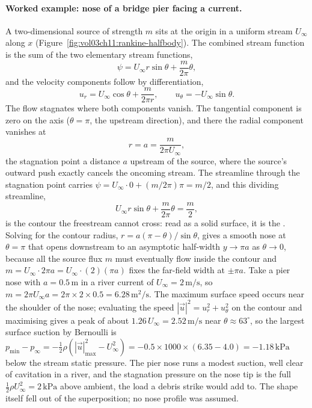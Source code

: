 

\paragraph{Worked example: nose of a bridge pier facing a current.} A
two-dimensional source of strength $m$ sits at the origin in a uniform
stream $U_\infty$ along $x$ (Figure~\ref{fig:vol03ch11:rankine-halfbody}).
The combined stream function is the sum of the two elementary stream
functions,
\[
\psi = U_\infty r\sin\theta + \frac{m}{2\pi}\theta,
\]
and the velocity components follow by differentiation,
\[
u_r = U_\infty\cos\theta + \frac{m}{2\pi r}, \qquad
u_\theta = -U_\infty\sin\theta.
\]
The flow stagnates where both components vanish. The tangential
component is zero on the axis ($\theta = \pi$, the upstream
direction), and there the radial component vanishes at
\[
r = a = \frac{m}{2\pi U_\infty},
\]
the stagnation point a distance $a$ upstream of the source, where the
source's outward push exactly cancels the oncoming stream. The
streamline through the stagnation point carries $\psi =
U_\infty\cdot 0 + (m/2\pi)\pi = m/2$, and this dividing streamline,
\[
U_\infty r\sin\theta + \frac{m}{2\pi}\theta = \frac{m}{2},
\]
is the contour the freestream cannot cross: read as a solid surface,
it is the . Solving for the contour radius,
$r = a(\pi - \theta)/\sin\theta$, gives a smooth nose at $\theta =
\pi$ that opens downstream to an asymptotic half-width $y \to \pi a$ as
$\theta \to 0$, because all the source flux $m$ must eventually flow
inside the contour and $m = U_\infty\cdot 2\pi a = U_\infty\cdot(2)(\pi
a)$ fixes the far-field width at $\pm\pi a$. Take a pier nose with $a =
0.5\,\si{\meter}$ in a river current of $U_\infty =
2\,\si{\meter\per\second}$, so $m = 2\pi U_\infty a = 2\pi\times 2
\times 0.5 = 6.28\,\si{\meter\squared\per\second}$. The maximum
surface speed occurs near the shoulder of the nose; evaluating the
speed $|\vec u|^2 = u_r^2 + u_\theta^2$ on the contour and maximising
gives a peak of about $1.26\,U_\infty = 2.52\,\si{\meter\per\second}$
near $\theta \approx 63^\circ$, so the largest surface suction by
Bernoulli is $p_\text{min} - p_\infty = -\tfrac12\rho(|\vec
u|_\text{max}^2 - U_\infty^2) = -0.5\times 1000\times(6.35 - 4.0) =
-1.18\,\text{kPa}$ below the stream static pressure. The pier nose
runs a modest suction, well clear of cavitation in a river, and the
stagnation pressure on the nose tip is the full $\tfrac12\rho
U_\infty^2 = 2\,\text{kPa}$ above ambient, the load a debris strike
would add to. The shape itself fell out of the superposition; no nose
profile was assumed.

